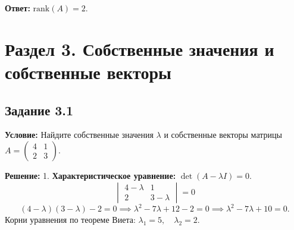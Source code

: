 \documentclass[11pt, a4paper]{article}
\begin{document}
\textbf{Ответ:} $\text{rank}(A) = 2$.

\newpage

\section{Раздел 3. Собственные значения и собственные векторы}

\subsection*{Задание 3.1}
\textbf{Условие:} Найдите собственные значения $\lambda$ и собственные векторы матрицы $A = \begin{pmatrix} 4 & 1 \\ 2 & 3 \end{pmatrix}$.

\textbf{Решение:}
1. \textbf{Характеристическое уравнение:} $\det(A - \lambda I) = 0$.
$$ \begin{vmatrix} 4 - \lambda & 1 \\ 2 & 3 - \lambda \end{vmatrix} = 0 $$
$$ (4 - \lambda)(3 - \lambda) - 2 = 0 \implies \lambda^2 - 7\lambda + 12 - 2 = 0 \implies \lambda^2 - 7\lambda + 10 = 0. $$
Корни уравнения по теореме Виета: $\lambda_1 = 5, \quad \lambda_2 = 2$.
\end{document}
